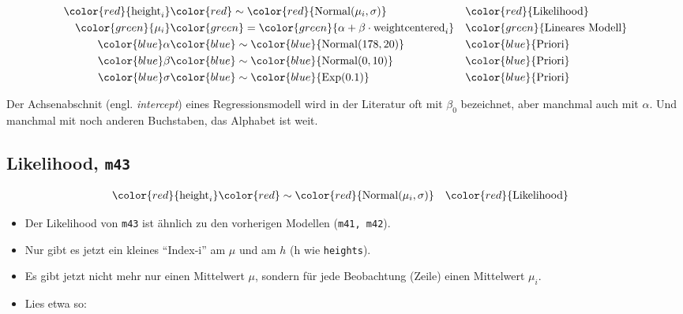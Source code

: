 \documentclass[
  a4paper,
  DIV=11]{scrreprt}
\providecommand{\tightlist}{%
  \setlength{\itemsep}{0pt}\setlength{\parskip}{0pt}}\usepackage{longtable,booktabs,array}
\theoremstyle{definition}
\theoremstyle{remark}
\begin{document}
\begin{align*}
\color{red}{\text{height}_i} & \color{red}\sim \color{red}{\operatorname{Normal}(\mu_i, \sigma)} && \color{red}{\text{Likelihood}} \\
\color{green}{\mu_i} & \color{green}= \color{green}{\alpha + \beta\cdot \text{weightcentered}_i}  && \color{green}{\text{Lineares Modell} } \\
\color{blue}\alpha & \color{blue}\sim \color{blue}{\operatorname{Normal}(178, 20)} && \color{blue}{\text{Priori}} \\
\color{blue}\beta  & \color{blue}\sim \color{blue}{\operatorname{Normal}(0, 10)}  && \color{blue}{\text{Priori}}\\
\color{blue}\sigma & \color{blue}\sim \color{blue}{\operatorname{Exp}(0.1)}  && \color{blue}{\text{Priori}}
\end{align*}

\begin{tcolorbox}[enhanced jigsaw, colframe=quarto-callout-note-color-frame, title=\textcolor{quarto-callout-note-color}{\faInfo}\hspace{0.5em}{Hinweis}, breakable, leftrule=.75mm, coltitle=black, toptitle=1mm, bottomrule=.15mm, bottomtitle=1mm, opacityback=0, arc=.35mm, rightrule=.15mm, left=2mm, colbacktitle=quarto-callout-note-color!10!white, opacitybacktitle=0.6, toprule=.15mm, titlerule=0mm, colback=white]
Der Achsenabschnit (engl. \emph{intercept}) eines Regressionsmodell wird
in der Literatur oft mit \(\beta_0\) bezeichnet, aber manchmal auch mit
\(\alpha\). Und manchmal mit noch anderen Buchstaben, das Alphabet ist
weit. 🤷
\end{tcolorbox}

\hypertarget{likelihood-m43}{%
\subsection{\texorpdfstring{Likelihood,
\texttt{m43}}{Likelihood, m43}}\label{likelihood-m43}}

\[
\begin{aligned}
\color{red}{\text{height}_i} & \color{red}\sim \color{red}{\operatorname{Normal}(\mu_i, \sigma)} && \color{red}{\text{Likelihood}}
\end{aligned}
\]

\begin{itemize}
\tightlist
\item
  Der Likelihood von \texttt{m43} ist ähnlich zu den vorherigen Modellen
  (\texttt{m41,\ m42}).
\item
  Nur gibt es jetzt ein kleines ``Index-i'' am \(\mu\) und am \(h\) (h
  wie \texttt{heights}).
\item
  Es gibt jetzt nicht mehr nur einen Mittelwert \(\mu\), sondern für
  jede Beobachtung (Zeile) einen Mittelwert \(\mu_i\).
\item
  Lies etwa so:
\end{itemize}
\end{document}

